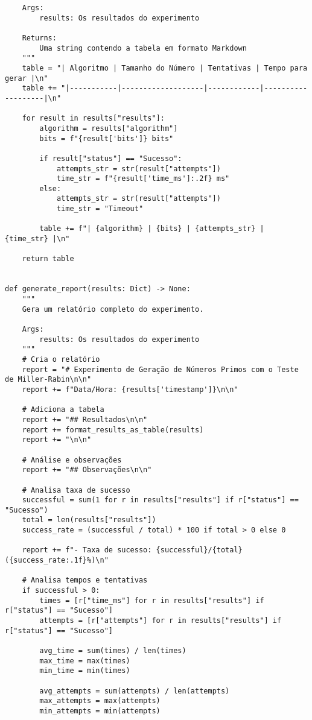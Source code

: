 \begin{verbatim}
    Args:
        results: Os resultados do experimento
        
    Returns:
        Uma string contendo a tabela em formato Markdown
    """
    table = "| Algoritmo | Tamanho do Número | Tentativas | Tempo para gerar |\n"
    table += "|-----------|-------------------|------------|-------------------|\n"
    
    for result in results["results"]:
        algorithm = results["algorithm"]
        bits = f"{result['bits']} bits"
        
        if result["status"] == "Sucesso":
            attempts_str = str(result["attempts"])
            time_str = f"{result['time_ms']:.2f} ms"
        else:
            attempts_str = str(result["attempts"])
            time_str = "Timeout"
        
        table += f"| {algorithm} | {bits} | {attempts_str} | {time_str} |\n"
    
    return table


def generate_report(results: Dict) -> None:
    """
    Gera um relatório completo do experimento.
    
    Args:
        results: Os resultados do experimento
    """
    # Cria o relatório
    report = "# Experimento de Geração de Números Primos com o Teste de Miller-Rabin\n\n"
    report += f"Data/Hora: {results['timestamp']}\n\n"
    
    # Adiciona a tabela
    report += "## Resultados\n\n"
    report += format_results_as_table(results)
    report += "\n\n"
    
    # Análise e observações
    report += "## Observações\n\n"
    
    # Analisa taxa de sucesso
    successful = sum(1 for r in results["results"] if r["status"] == "Sucesso")
    total = len(results["results"])
    success_rate = (successful / total) * 100 if total > 0 else 0
    
    report += f"- Taxa de sucesso: {successful}/{total} ({success_rate:.1f}%)\n"
    
    # Analisa tempos e tentativas
    if successful > 0:
        times = [r["time_ms"] for r in results["results"] if r["status"] == "Sucesso"]
        attempts = [r["attempts"] for r in results["results"] if r["status"] == "Sucesso"]
        
        avg_time = sum(times) / len(times)
        max_time = max(times)
        min_time = min(times)
        
        avg_attempts = sum(attempts) / len(attempts)
        max_attempts = max(attempts)
        min_attempts = min(attempts)
        

\end{verbatim}
